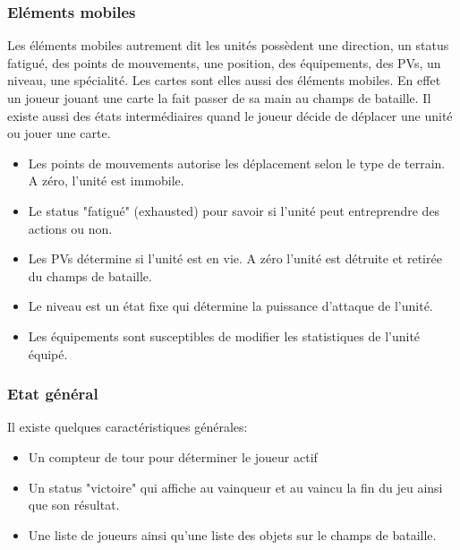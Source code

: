 \newpage


\subsubsection{Eléments mobiles}
Les éléments mobiles autrement dit les unités possèdent une direction, un status fatigué, des points de mouvements, une position, des équipements, des PVs, un niveau, une spécialité. Les cartes sont elles aussi des éléments mobiles. En effet un joueur jouant une carte la fait passer de sa main au champs de bataille. \n
Il existe aussi des états intermédiaires quand le joueur décide de déplacer une unité ou jouer une carte.

\begin{itemize}
    \item Les points de mouvements autorise les déplacement selon le type de terrain. A zéro, l'unité est immobile.
    \item Le status "fatigué" (exhausted) pour savoir si l'unité peut entreprendre des actions ou non.
    \item Les PVs détermine si l'unité est en vie. A zéro l'unité est détruite et retirée du champs de bataille. 
    \item Le niveau est un état fixe qui détermine la puissance d'attaque de l'unité.
    \item Les équipements sont susceptibles de modifier les statistiques de l'unité équipé.
    
\end{itemize}


\subsubsection{Etat général}

Il existe quelques caractéristiques générales:

\begin{itemize}
    \item Un compteur de tour pour déterminer le joueur actif
    \item Un status "victoire" qui affiche au vainqueur et au vaincu la fin du jeu ainsi que son résultat.
    \item Une liste de joueurs ainsi qu'une liste des objets sur le champs de bataille.
\end{itemize}


\newpage


